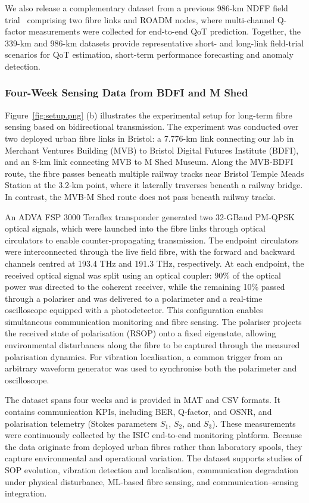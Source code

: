 \documentclass[9pt,twocolumn,twoside]{osajnl}
\begin{document}
We also release a complementary dataset from a previous 986-km NDFF field trial~\cite{YangOFC2023} comprising two fibre links and ROADM nodes, where multi-channel Q-factor measurements were collected for end-to-end QoT prediction. Together, the 339-km and 986-km datasets provide representative short- and long-link field-trial scenarios for QoT estimation, short-term performance forecasting and anomaly detection.


\vspace{-0.2cm}
\subsubsection{Four-Week Sensing Data from BDFI and M Shed}

Figure~\ref{fig:setup.png} (b) illustrates the experimental setup for long-term fibre sensing based on bidirectional transmission. The experiment was conducted over two deployed urban fibre links in Bristol: a 7.776-km link connecting our lab in Merchant Ventures Building (MVB) to Bristol Digital Futures Institute (BDFI), and an 8-km link connecting MVB to M Shed Museum. Along the MVB-BDFI route, the fibre passes beneath multiple railway tracks near Bristol Temple Meads Station at the 3.2-km point, where it laterally traverses beneath a railway bridge. In contrast, the MVB-M Shed route does not pass beneath railway tracks.

An ADVA FSP 3000 Teraflex transponder generated two 32-GBaud PM-QPSK optical signals, which were launched into the fibre links through optical circulators to enable counter-propagating transmission. The endpoint circulators were interconnected through the live field fibre, with the forward and backward channels centred at 193.4 THz and 191.3 THz, respectively. At each endpoint, the received optical signal was split using an optical coupler: 90\% of the optical power was directed to the coherent receiver, while the remaining 10\% passed through a polariser and was delivered to a polarimeter and a real-time oscilloscope equipped with a photodetector. This configuration enables simultaneous communication monitoring and fibre sensing. The polariser projects the received state of polarisation (RSOP) onto a fixed eigenstate, allowing environmental disturbances along the fibre to be captured through the measured polarisation dynamics. For vibration localisation, a common trigger from an arbitrary waveform generator was used to synchronise both the polarimeter and oscilloscope.

The dataset spans four weeks and is provided in MAT and CSV formats. It contains communication KPIs, including BER, Q-factor, and OSNR, and polarisation telemetry (Stokes parameters $S_1$, $S_2$, and $S_3$). These measurements were continuously collected by the ISIC end-to-end monitoring platform. Because the data originate from deployed urban fibres rather than laboratory spools, they capture environmental and operational variation. The dataset supports studies of SOP evolution, vibration detection and localisation, communication degradation under physical disturbance, ML-based fibre sensing, and communication--sensing integration.
\end{document}
